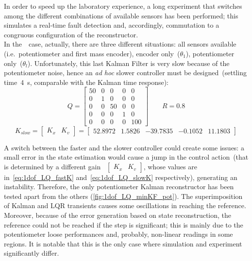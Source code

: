 In order to speed up the laboratory experience, a long experiment that switches among the different combinations of available sensors has been performed; this simulates a real-time fault detection and, accordingly, commutation to a congruous configuration of the reconstructor. \\
\newpage
In the~\onedof\ case, actually, there are three different situations: all sensors available (i.e.~potentiometer and first mass encoder), encoder only~($\theta_1$), potentiometer only~($\theta_l$). Unfortunately, this last Kalman Filter is very slow because of the potentiometer noise, hence an \textit{ad hoc} slower controller must be designed~(settling time~4~s, comparable with the Kalman time response):
\[
	Q =
	\begin{bmatrix}
		50 & 0 & 0 & 0 & 0 \\
		0 & 1 & 0 & 0 & 0 \\
		0 & 0 & 50 & 0 & 0 \\
		0 & 0 & 0 & 1 & 0 \\
		0 & 0 & 0 & 0 & 100
	\end{bmatrix}
	\qquad
	R = 0.8
\]
\begin{equation}
	K_{slow} =
	\left[
	\begin{array}{c|c}
		K_x & K_v
	\end{array}
	\right]
	=
	\left[
	\begin{array}{cccc|c}
		52.8972 & 1.5826 & -39.7835 & -0.1052 & 11.1803
	\end{array}
	\right]
	\label{eq:1dof_LQ_slowK}
\end{equation}

A switch between the faster and the slower controller could create some issues: a small error in the state estimation would cause a jump in the control action~(that is determined by a different gain~
$
\left[
	\begin{array}{c|c}
		K_x & K_v
	\end{array}
\right]
$, whose values are in~\cref{eq:1dof_LQ_fastK} and~\cref{eq:1dof_LQ_slowK} respectively), generating an instability. Therefore, the only potentiometer Kalman reconstructor has been tested apart from the others (\cref{fig:1dof_LQ_minKF_pot}). The superimposition of Kalman and LQR transients causes some oscillations in reaching the reference. Moreover, because of the error generation based on state reconstruction, the reference could not be reached if the step is significant; this is mainly due to the potentiometer loose performances and, probably, non-linear readings in some regions. It is notable that this is the only case where simulation and experiment significantly differ.

